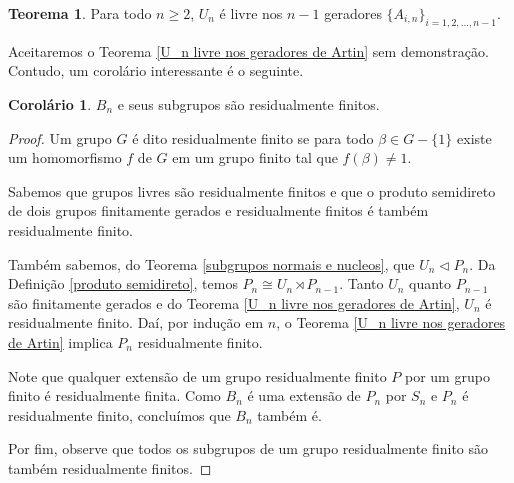\documentclass[a4paper,portuguese,11pt,twoside, leqno]{book}
\theoremstyle{definition}
\newtheorem{theorem}{Teorema}[section]
\newtheorem{corollary}{Corolário}[theorem]
\begin{document}
	\begin{theorem}
		\label{U_n livre nos geradores de Artin}
		Para todo $n\geq 2$, $U_n$ é livre nos $n-1$ geradores $\{ A_{i,n} \}_{i=1,2,\dots,n-1}$.
	\end{theorem}
	
	\par\vspace{0.3cm} Aceitaremos o Teorema \eqref{U_n livre nos geradores de Artin} sem demonstração. Contudo, um corolário interessante é o seguinte.
	
	\begin{corollary}
		\label{B_n residualmente finito}
		$B_n$ e seus subgrupos são residualmente finitos.
	\end{corollary}
	
	\begin{proof}
		Um grupo $G$ é dito residualmente finito se para todo $\beta\in G-\{1\}$ existe um homomorfismo $f$ de $G$ em um grupo finito tal que $f(\beta)\neq 1$.
		\par\vspace{0.3cm} Sabemos que grupos livres são residualmente finitos e que o produto semidireto de dois grupos finitamente gerados e residualmente finitos é também residualmente finito.
		\par\vspace{0.3cm} Também sabemos, do Teorema \eqref{subgrupos normais e nucleos}, que $U_n\vartriangleleft P_n$. Da Definição \eqref{produto semidireto}, temos $P_n\cong U_n\rtimes P_{n-1}$. Tanto $U_n$ quanto $P_{n-1}$ são finitamente gerados e do Teorema \eqref{U_n livre nos geradores de Artin}, $U_n$ é residualmente finito. Daí, por indução em $n$, o Teorema \eqref{U_n livre nos geradores de Artin} implica $P_n$ residualmente finito.
		\par\vspace{0.3cm} Note que qualquer extensão de um grupo residualmente finito $P$ por um grupo finito é residualmente finita. Como $B_n$ é uma extensão de $P_n$ por $S_n$ e $P_n$ é residualmente finito, concluímos que $B_n$ também é.
		\par\vspace{0.3cm} Por fim, observe que todos os subgrupos de um grupo residualmente finito são também residualmente finitos.	
	\end{proof}
\end{document}
